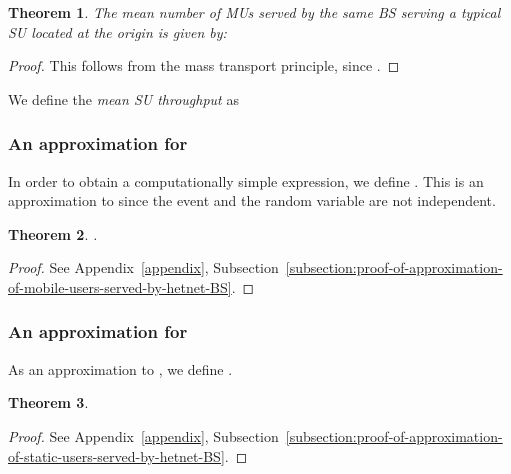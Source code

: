 \documentclass[10pt,journal]{IEEEtran}
\newtheorem{theorem}{Theorem}
\begin{document}
\begin{theorem}\label{theorem:mean-number-of-MU-served-by-a-hetnet-BS}
The mean number of MUs served by the same BS serving a typical SU located at the origin is given by:
 
\end{theorem}
\begin{proof}
This follows from the mass transport principle, since  .
\end{proof}

We define the {\em mean SU  throughput} as




\subsubsection{An approximation for }
\label{subsubsection:simpler-expression}
In order to obtain a computationally simple expression, we define 
. This is an approximation 
to  since the event  and the random variable 
 are not independent. 

\begin{theorem}\label{theorem:approximation-of-mobile-users-served-by-hetnet-BS}
 .
\end{theorem}
\begin{proof}
 See Appendix~\ref{appendix}, 
 Subsection~\ref{subsection:proof-of-approximation-of-mobile-users-served-by-hetnet-BS}.
\end{proof}






\subsubsection{An approximation for }
\label{subsubsection:approximation-for-mean-number-of-static-users-co-served-with-a-static-user}
As an approximation to , we define 
. 

\begin{theorem}\label{theorem:approximation-of-static-users-served-by-hetnet-BS}
\footnotesize

\end{theorem}
\normalsize
\begin{proof}
 See Appendix~\ref{appendix}, 
 Subsection~\ref{subsection:proof-of-approximation-of-static-users-served-by-hetnet-BS}.
\end{proof}
\end{document}
